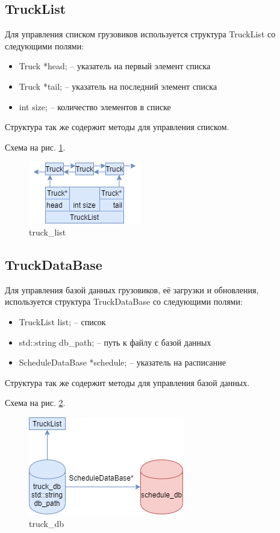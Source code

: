 \subsection{TruckList}

Для управления списком грузовиков используется структура TruckList со следующими полями:

\begin{itemize}
    \item Truck *head; -- указатель на первый элемент списка
    \item Truck *tail; -- указатель на последний элемент списка
    \item int size; -- количество элементов в списке
\end{itemize}

Структура так же содержит методы для управления списком.

Схема на рис. \ref{truck_list}.

\begin{figure}[hpt!]
    \centering
    \includegraphics[width=0.4\linewidth]{photo/truck_list}
    \caption{truck\_list}
    \label{truck_list}
\end{figure}

\subsection{TruckDataBase}

Для управления базой данных грузовиков, 
её загрузки и обновления, 
используется структура TruckDataBase со следующими полями: 

\begin{itemize}
    \item TruckList list{}; -- список
    \item std::string db\_path{}; -- путь к файлу с базой данных
    \item ScheduleDataBase *schedule{}; -- указатель на расписание
\end{itemize}

Структура так же содержит методы для управления базой данных.

Схема на рис. \ref{truck_db}.

\begin{figure}[H]
    \centering
    \includegraphics[width=0.4\linewidth]{photo/truck_db}
    \caption{truck\_db}
    \label{truck_db}
\end{figure}

